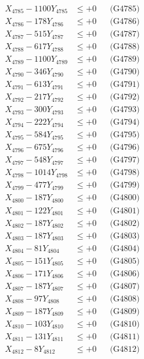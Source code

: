 \documentclass[a4paper,10pt]{article}
\begin{document}
{\begin{align}
X_{4785} - 1100Y_{4785} &\leq +0 && \text{(G4785)} \\
X_{4786} - 178Y_{4786} &\leq +0 && \text{(G4786)} \\
X_{4787} - 515Y_{4787} &\leq +0 && \text{(G4787)} \\
X_{4788} - 617Y_{4788} &\leq +0 && \text{(G4788)} \\
X_{4789} - 1100Y_{4789} &\leq +0 && \text{(G4789)} \\
X_{4790} - 346Y_{4790} &\leq +0 && \text{(G4790)} \\
\allowbreak
X_{4791} - 613Y_{4791} &\leq +0 && \text{(G4791)} \\
X_{4792} - 217Y_{4792} &\leq +0 && \text{(G4792)} \\
X_{4793} - 300Y_{4793} &\leq +0 && \text{(G4793)} \\
X_{4794} - 222Y_{4794} &\leq +0 && \text{(G4794)} \\
X_{4795} - 584Y_{4795} &\leq +0 && \text{(G4795)} \\
X_{4796} - 675Y_{4796} &\leq +0 && \text{(G4796)} \\
X_{4797} - 548Y_{4797} &\leq +0 && \text{(G4797)} \\
X_{4798} - 1014Y_{4798} &\leq +0 && \text{(G4798)} \\
X_{4799} - 477Y_{4799} &\leq +0 && \text{(G4799)} \\
X_{4800} - 187Y_{4800} &\leq +0 && \text{(G4800)} \\
\allowbreak
X_{4801} - 122Y_{4801} &\leq +0 && \text{(G4801)} \\
X_{4802} - 187Y_{4802} &\leq +0 && \text{(G4802)} \\
X_{4803} - 187Y_{4803} &\leq +0 && \text{(G4803)} \\
X_{4804} - 81Y_{4804} &\leq +0 && \text{(G4804)} \\
X_{4805} - 151Y_{4805} &\leq +0 && \text{(G4805)} \\
X_{4806} - 171Y_{4806} &\leq +0 && \text{(G4806)} \\
X_{4807} - 187Y_{4807} &\leq +0 && \text{(G4807)} \\
X_{4808} - 97Y_{4808} &\leq +0 && \text{(G4808)} \\
X_{4809} - 187Y_{4809} &\leq +0 && \text{(G4809)} \\
X_{4810} - 103Y_{4810} &\leq +0 && \text{(G4810)} \\
\allowbreak
X_{4811} - 131Y_{4811} &\leq +0 && \text{(G4811)} \\
X_{4812} - 8Y_{4812} &\leq +0 && \text{(G4812)} \\

\end{align}}
\end{document}
